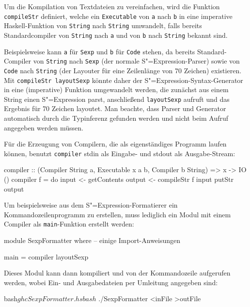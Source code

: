 \documentclass[12pt, a4paper, bibgerm]{scrbook}
\newenvironment{DIFnomarkup}{}{}
\newcommand\icode[1]{\lstinline?#1?}
\newcommand{\sexp}{S"=Expression}
\begin{document}
Um die Kompilation von Textdateien zu vereinfachen, wird die Funktion
\icode{compileStr} definiert, welche ein \icode{Executable} von
\icode{a} nach \icode{b} in eine imperative Haskell-Funktion von
\icode{String} nach \icode{String} umwandelt, falls bereits
Standardcompiler von \icode{String} nach \icode{a} und von \icode{b}
nach \icode{String} bekannt sind.   
\begin{DIFnomarkup}\end{DIFnomarkup} %
Beispielsweise kann \icode{a} für \icode{Sexp} und \icode{b} für
\icode{Code} stehen, da bereits Standard-Compiler von \icode{String}
nach \icode{Sexp} (der normale \sexp{}-Parser) sowie von \icode{Code}
nach \icode{String} (der Layouter für eine Zeilenlänge von 70 Zeichen)
existieren. Mit \icode{compileStr layoutSexp} könnte daher der
\sexp{}-Syntax-Generator in eine (imperative) Funktion umgewandelt
werden, die zunächst aus einem String einen \sexp{} parst, anschließend
\icode{layoutSexp} aufruft und das Ergebnis für 70 Zeichen layoutet. Man
beachte, dass Parser und Generator automatisch durch die Typinferenz
gefunden werden und nicht beim Aufruf angegeben werden müssen.

Für die Erzeugung von Compilern, die als eigenständiges Programm laufen
können, benutzt \icode{compiler} stdin als Eingabe- und stdout als
Ausgabe-Stream:
\begin{DIFnomarkup}\begin{code}
compiler :: (Compiler String a, Executable x a b, Compiler b String) => x -> IO ()
compiler f = do
  input <- getContents
  output <- compileStr f input
  putStr output  
\end{code}\end{DIFnomarkup}
Um beispielsweise aus dem \sexp{}-Formatierer ein Kommandozeilenprogramm
zu erstellen, muss lediglich ein Modul mit einem Compiler als
\icode{main}-Funktion erstellt werden:
\begin{DIFnomarkup}\begin{code}
module SexpFormatter where
-- einige Import-Anweisungen

main = compiler layoutSexp
\end{code}\end{DIFnomarkup}
Dieses Modul kann dann kompiliert und von der Kommandozeile
aufgerufen werden, wobei Ein- und Ausgabedateien per Umleitung angegeben
sind:
\begin{DIFnomarkup}\begin{code}
bash$ ghc SexpFormatter.hs
bash$ ./SexpFormatter <inFile >outFile
\end{code}\end{DIFnomarkup}
\end{document}
